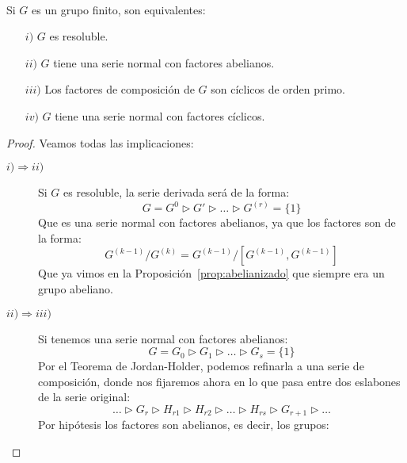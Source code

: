\begin{teo}\ \\
    Si $G$ es un grupo finito, son equivalentes:
    \begin{enumerate}
        \item[$i)$] $G$ es resoluble.
        \item[$ii)$] $G$ tiene una serie normal con factores abelianos.
        \item[$iii)$] Los factores de composición de $G$ son cíclicos de orden primo.
        \item[$iv)$] $G$ tiene una serie normal con factores cíclicos.
    \end{enumerate}
    \begin{proof}
        Veamos todas las implicaciones:
        \begin{description}
            \item [$i) \Longrightarrow ii)$] Si $G$ es resoluble, la serie derivada será de la forma:
                \begin{equation*}
                    G = G^0 \rhd G' \rhd \ldots \rhd G^{(r)} = \{1\}
                \end{equation*}
                Que es una serie normal con factores abelianos, ya que los factores son de la forma:
                \begin{equation*}
                    G^{(k-1)}/G^{(k)} = G^{(k-1)}/\left[G^{(k-1)},G^{(k-1)}\right]
                \end{equation*}
                Que ya vimos en la Proposición~\ref{prop:abelianizado} que siempre era un grupo abeliano.
            \item [$ii) \Longrightarrow iii)$] Si tenemos una serie normal con factores abelianos:
                \begin{equation*}
                    G = G_0 \rhd G_1 \rhd  \ldots \rhd G_{s} = \{1\}
                \end{equation*}
                Por el Teorema de Jordan-Holder, podemos refinarla a una serie de composición, donde nos fijaremos ahora en lo que pasa entre dos eslabones de la serie original:
                \begin{equation*}
                    \ldots \rhd G_{r} \rhd H_{r1} \rhd H_{r2} \rhd \ldots \rhd H_{rs} \rhd G_{r+1} \rhd \ldots
                \end{equation*}
                Por hipótesis los factores son abelianos, es decir, los grupos:
                \begin{equation*}

\end{equation*}
\end{description}
\end{proof}
\end{teo}

